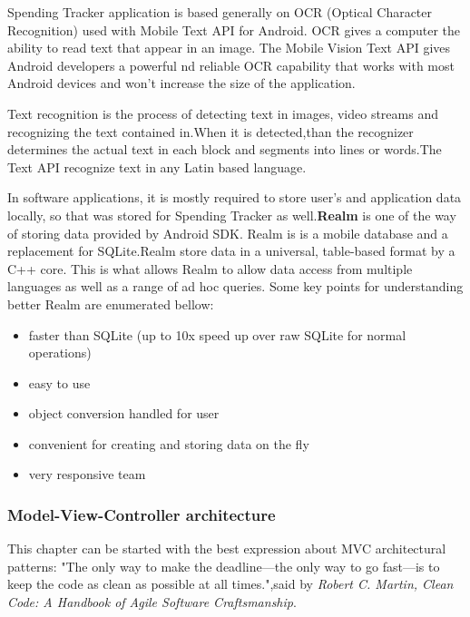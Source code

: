 Spending Tracker application is based generally on OCR (Optical Character Recognition) used with Mobile Text API for Android. OCR gives a computer the ability to read text that appear in an image. The Mobile Vision Text API gives Android developers a powerful nd reliable OCR capability that works with most Android devices and won't increase the size of the application.\cite{Codelabs}

Text recognition is the process of detecting text in images, video streams and recognizing the text contained in.When it is detected,than the recognizer determines the actual text in each block and segments into lines or words.The Text API recognize text in any Latin based language.
\cite{Text Recognition API}

In software applications, it is mostly required to store user’s and application data locally, so that was stored for Spending Tracker as well.\textbf{Realm} is one of the way of storing data provided by Android SDK. Realm is is a mobile database and a replacement for SQLite.Realm store data in a universal, table-based format by a C++ core. This is what allows Realm to allow data access from multiple languages as well as a range of ad hoc queries.
Some key points for understanding better Realm are enumerated bellow:\cite{Realm}
\begin{itemize}
	\item faster than SQLite (up to 10x speed up over raw SQLite for normal operations)
	\item easy to use
	\item object conversion handled for user
	\item convenient for creating and storing data on the fly
	\item very responsive team
\end{itemize}

\subsubsection{ Model-View-Controller architecture}
This chapter can be started with the best expression about MVC architectural patterns: "The only way to make the deadline—the only way to go fast—is to keep the code as clean as possible at all times.",said by \textit{Robert C. Martin, Clean Code: A Handbook of Agile Software Craftsmanship}\cite{MVC in Android}.

